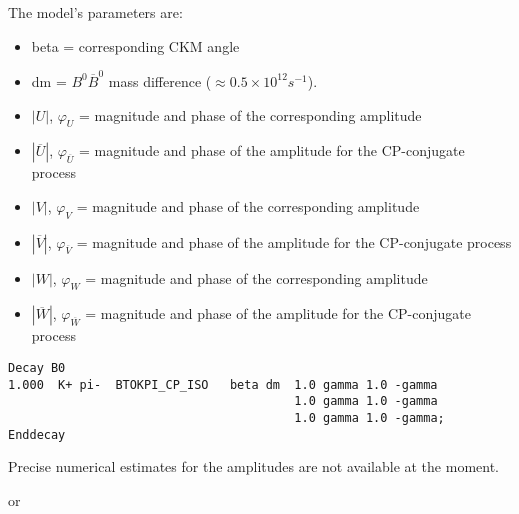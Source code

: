 The model's parameters are:
\begin{itemize}
\item
beta = corresponding CKM angle
\item
dm = $B^{0} \overline{B}^{0}$ mass difference ($\approx 0.5 \times 10^{12} s^{-1}$).  
\item
$|U|$, $\varphi_{U}$  = magnitude and phase of the corresponding amplitude
\item
$|\overline{U}|$, $\varphi_{\overline{U}}$ = magnitude and phase of the amplitude for the CP-conjugate process
\item
$|V|$, $\varphi_{V}$  = magnitude and phase of the corresponding amplitude
\item
$|\overline{V}|$, $\varphi_{\overline{V}}$ = magnitude and phase of the amplitude for the CP-conjugate process
\item
$|W|$, $\varphi_{W}$  = magnitude and phase of the corresponding amplitude
\item
$|\overline{W}|$, $\varphi_{\overline{W}}$ = magnitude and phase of the amplitude for the CP-conjugate process
\end{itemize}

\Example

\begin{verbatim}
Decay B0
1.000  K+ pi-  BTOKPI_CP_ISO   beta dm  1.0 gamma 1.0 -gamma 
                                        1.0 gamma 1.0 -gamma 
                                        1.0 gamma 1.0 -gamma; 
Enddecay
\end{verbatim}

\Notes
Precise numerical estimates for the amplitudes are not available at the moment.



\label{btoxsgamma}


or\\


